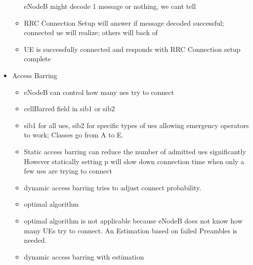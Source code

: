 \documentclass[conference]{IEEEtran}
\begin{document}
\begin{itemize}
\begin{itemize}
        eNodeB might decode 1 message or nothing, we cant tell
        \item RRC Connection Setup will answer if message decoded successful; connected ue will realize; others will back of
        \item UE is successfully connected and responds with RRC Connection setup complete
    \end{itemize}
    \item Access Barring
    \begin{itemize}
        \item eNodeB can control how many ues try to connect
        \item cellBarred field in sib1 or sib2
        \item sib1 for all ues, sib2 for specific types of ues allowing emergency operators to work; Classes go from A to E.
        \item Static access barring can reduce the number of admitted ues significantly
        However statically setting p will slow down connection time when only a few ues are trying to connect
        \item dynamic access barring tries to adjust connect probability.
        \item optimal algorithm
        \item optimal algorithm is not applicable because eNodeB does not know how many UEs try to connect.
        An Estimation based on failed Preambles is needed.
        \item dynamic access barring with estimation
    \end{itemize}
\end{itemize}
\end{document}
